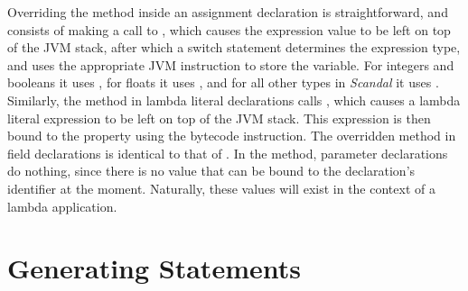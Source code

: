 Overriding the  method inside an assignment declaration is straightforward, and consists of making a call to , which causes the expression value to be left on top of the JVM stack, after which a switch statement determines the expression type, and uses the appropriate JVM instruction to store the variable. For integers and booleans it uses , for floats it uses , and for all other types in \emph{Scandal} it uses . Similarly, the  method in lambda literal declarations calls , which causes a lambda literal expression to be left on top of the JVM stack. This expression is then bound to the  property using the  bytecode instruction. The overridden  method in field declarations is identical to that of . In the  method, parameter declarations do nothing, since there is no value that can be bound to the declaration's identifier at the moment. Naturally, these values will exist in the context of a lambda application.

\section{Generating Statements}

